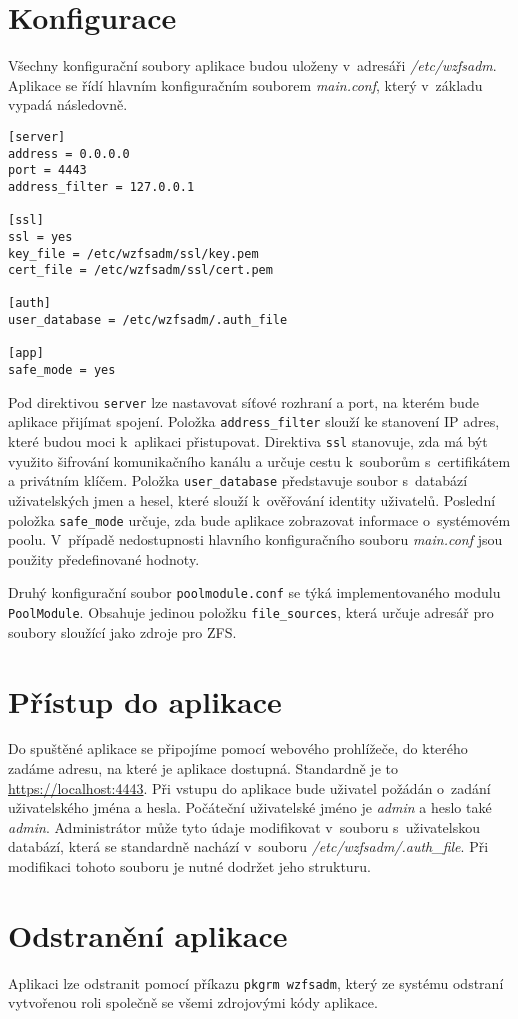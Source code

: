 \section{Konfigurace}
Všechny konfigurační soubory aplikace budou uloženy v~adresáři \emph{/etc/wzfsadm}. Aplikace se řídí hlavním konfiguračním souborem \emph{main.conf}, který v~základu vypadá následovně.
\begin{verbatim}
[server]
address = 0.0.0.0
port = 4443
address_filter = 127.0.0.1

[ssl]
ssl = yes
key_file = /etc/wzfsadm/ssl/key.pem
cert_file = /etc/wzfsadm/ssl/cert.pem

[auth]
user_database = /etc/wzfsadm/.auth_file

[app]
safe_mode = yes
\end{verbatim}
Pod direktivou \verb|server| lze nastavovat síťové rozhraní a port, na kterém bude aplikace přijímat spojení. Položka \verb|address_filter| slouží ke stanovení IP adres, které budou moci k~aplikaci přistupovat. Direktiva \verb|ssl| stanovuje, zda má být využito šifrování komunikačního kanálu a určuje cestu k~souborům s~certifikátem a privátním klíčem. Položka \verb|user_database| představuje soubor s~databází uživatelských jmen a hesel, které slouží k~ověřování identity uživatelů. Poslední položka \verb|safe_mode| určuje, zda bude aplikace zobrazovat informace o~systémovém poolu. V~případě nedostupnosti hlavního konfiguračního souboru \emph{main.conf} jsou použity předefinované hodnoty.

Druhý konfigurační soubor \verb|poolmodule.conf| se týká implementovaného modulu \verb|PoolModule|. Obsahuje jedinou položku \verb|file_sources|, která určuje adresář pro soubory sloužící jako zdroje pro ZFS.

\section{Přístup do aplikace}
Do spuštěné aplikace se připojíme pomocí webového prohlížeče, do kterého zadáme adresu, na které je aplikace dostupná. Standardně je to \url{https://localhost:4443}. Při vstupu do aplikace bude uživatel požádán o~zadání uživatelského jména a hesla. Počáteční uživatelské jméno je \emph{admin} a heslo také \emph{admin}. Administrátor může tyto údaje modifikovat v~souboru s~uživatelskou databází, která se standardně nachází v~souboru \emph{/etc/wzfsadm/.auth\_file}. Při modifikaci tohoto souboru je nutné dodržet jeho strukturu.

\section{Odstranění aplikace}
Aplikaci lze odstranit pomocí příkazu \verb|pkgrm wzfsadm|, který ze systému odstraní vytvořenou roli společně se všemi zdrojovými kódy aplikace. 